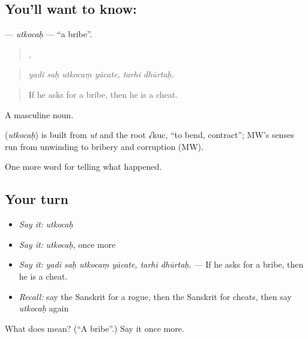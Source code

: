 \subsection*{You'll want to know: }
\textbf{} — \emph{utkocaḥ} — \textquotedblleft{}a bribe\textquotedblright{}.

\begin{quote}
   ,  
\end{quote}

\begin{quote}
\emph{yadi saḥ utkocaṃ yācate, tarhi dhūrtaḥ.}
\end{quote}

\begin{quote}
If he asks for a bribe, then he is a cheat.
\end{quote}

A masculine noun.

\begin{cousinweb}
\textbf{} (\emph{utkocaḥ}) is built from \emph{ut} and the root √kuc, \textquotedblleft{}to bend, contract\textquotedblright{}; MW's senses run from unwinding to bribery and corruption (MW).
\end{cousinweb}

\begin{grammarlens}[title={What you've built}]
One more word for telling what happened.
\end{grammarlens}

\subsection*{Your turn}
\begin{itemize}
\raggedright
  \item \emph{Say it:} \emph{utkocaḥ}
  \item \emph{Say it:} \emph{utkocaḥ}, once more
  \item \emph{Say it:} \emph{yadi saḥ utkocaṃ yācate, tarhi dhūrtaḥ.} — If he asks for a bribe, then he is a cheat.
  \item \emph{Recall:} say the Sanskrit for a rogue, then the Sanskrit for cheats, then say \emph{utkocaḥ} again
\end{itemize}

\begin{tcolorbox}[breakable,colback=teal!4,colframe=teal!35!black,title={Before you move on}]
What does  mean? (\textquotedblleft{}A bribe\textquotedblright{}.) Say it once more.
\end{tcolorbox}
